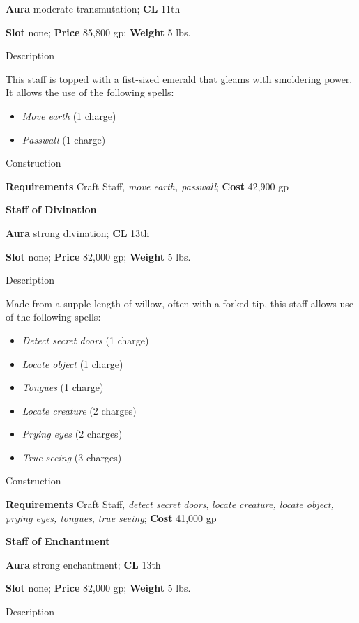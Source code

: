 \textbf{Aura} moderate transmutation;\textbf{ CL }11th
				
\textbf{Slot} none; \textbf{Price} 85,800 gp; \textbf{Weight} 5 lbs.
				
Description
				
This staff is topped with a fist-sized emerald that gleams with smoldering power. It allows the use of the following spells: 
				\begin{itemize}\item  \textit{Move earth} (1 charge) 
				\item  \textit{Passwall} (1 charge)
\end{itemize}
				
Construction
				
\textbf{Requirements} Craft Staff, \textit{move earth, passwall}; \textbf{Cost }42,900 gp
				
\textbf{Staff of Divination}
				
\textbf{Aura} strong divination; \textbf{CL} 13th
				
\textbf{Slot} none; \textbf{Price} 82,000 gp; \textbf{Weight} 5 lbs.
				
Description
				
Made from a supple length of willow, often with a forked tip, this staff allows use of the following spells:
				\begin{itemize}\item  \textit{Detect secret doors} (1 charge)
				\item  \textit{Locate object} (1 charge)
				\item  \textit{Tongues} (1 charge)
				\item  \textit{Locate creature} (2 charges)
				\item  \textit{Prying eyes} (2 charges)
				\item  \textit{True seeing} (3 charges) 
\end{itemize}
				
Construction
				
\textbf{Requirements} Craft Staff, \textit{detect secret doors}, \textit{locate creature, locate object, prying eyes, tongues}, \textit{true seeing}; \textbf{Cost }41,000 gp
				
\textbf{Staff of Enchantment}
				
\textbf{Aura} strong enchantment; \textbf{CL} 13th
				
\textbf{Slot} none; \textbf{Price} 82,000 gp; \textbf{Weight} 5 lbs.
				
Description
				
